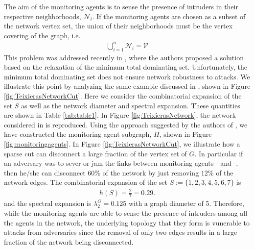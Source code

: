 \documentclass{amsart}
\theoremstyle{definition}
\theoremstyle{remark}
\numberwithin{equation}{section}
\newcommand*\circled[1]{\tikz[baseline=(char.base)]{
            \node[shape=circle,draw,inner sep=2pt] (char) {#1};}}
\def\cN{\mathcal{N}}
\def\cV{\mathcal{V}}
\begin{document}
The aim of the monitoring agents is to sense the presence of intruders in their respective neighborhoods, $\cN_i$. If the monitoring agents are chosen as a subset of the network vertex set, the union of their neighborhoods must be the vertex covering of the graph, i.e.
\begin{align*}
\bigcup_{i = 1}^n \cN_i = \cV
\end{align*}
This problem was addressed recently in \cite{Teix2014}, where the authors proposed a solution based on the relaxation of the minimum total dominating set. Unfortunately, the minimum total dominating set does not ensure network robustness to attacks. We illustrate this point by analyzing the same example discussed in \cite{Teix2014}, shown in Figure \ref{fig:TeixierasNetworkCut}. Here we consider the combinatorial expansion of the set $S$ as well as the network diameter and spectral expansion. These quantities are shown in Table \ref{tab:table1}.  In Figure \ref{fig:TeixierasNetwork}, the network considered in \cite{Teix2014} is reproduced. Using the approach suggested by the authors of \cite{Teix2014}, we have constructed the monitoring agent subgraph, $H$, shown in Figure \ref{fig:monitoringagents}. In Figure \ref{fig:TeixierasNetworkCut}, we illustrate how a sparse cut can disconnect a large fraction of the vertex set of $G$. In particular if an adversary was to sever or jam the links between monitoring agents \circled{4}-\circled{8} and \circled{3}-\circled{10}, then he/she can disconnect $60\%$ of the network by just removing $12\%$ of the network edges. The combinatorial expansion of the set $S:=\{1,2,3,4,5,6,7\}$ is 
\begin{align*}
h(S) = \frac{2}{7} = 0.29.
\end{align*}
and the spectral expansion is $\lambda_2^G = 0.125$ with a graph diameter of 5. Therefore, while the monitoring agents are able to sense the presence of intruders among all the agents in the network, the underlying topology that they form is vunerable to attacks from adversaries since the removal of only two edges results in a large fraction of the network being disconnected. 
\end{document}
